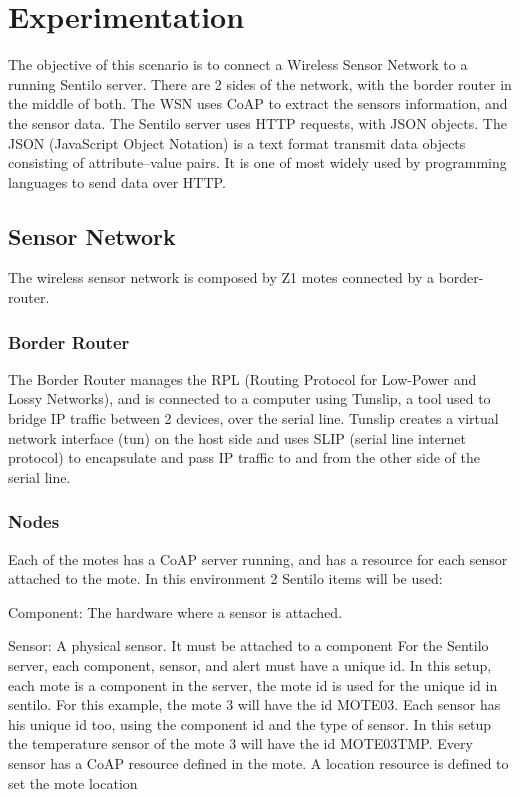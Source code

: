 \section{Experimentation}


The objective of this scenario is to connect a Wireless Sensor Network to a running Sentilo server.
There are 2 sides of the network,
	with the border router in the middle of both.
The WSN uses CoAP to extract the sensors information,
	and the sensor data.
The Sentilo server uses HTTP requests,
	with JSON objects.
The JSON (JavaScript Object Notation) is a text format transmit data objects consisting of attribute–value pairs.
It is one of most widely used by programming languages to send data over HTTP.

\subsection{Sensor Network}
The wireless sensor network is composed by Z1 motes connected by a border-router.


\subsubsection{Border Router}
The Border Router manages the RPL (Routing Protocol for Low-Power and Lossy Networks),
	and is connected to a computer using Tunslip,
	a tool used to bridge IP traffic between 2 devices,
	over the serial line.
Tunslip creates a virtual network interface (tun) on the host side and uses SLIP (serial line internet protocol) to encapsulate and pass IP traffic to and from the other side of the serial line.

\subsubsection{Nodes}
Each of the motes has a CoAP server running,
	and has a resource for each sensor attached to the mote.
In this environment 2 Sentilo items will be used:

Component:
	The hardware where a sensor is attached.

Sensor:
	A physical sensor.
It must be attached to a component For the Sentilo server,
	each component,
	sensor,
	and alert must have a unique id.
In this setup,
	each mote is a component in the server,
	the mote id is used for the unique id in sentilo.
For this example,
	the mote 3 will have the id MOTE03.
Each sensor has his unique id too,
	using the component id and the type of sensor.
In this setup the temperature sensor of the mote 3 will have the id MOTE03TMP.
Every sensor has a CoAP resource defined in the mote.
A location resource is defined to set the mote location 

